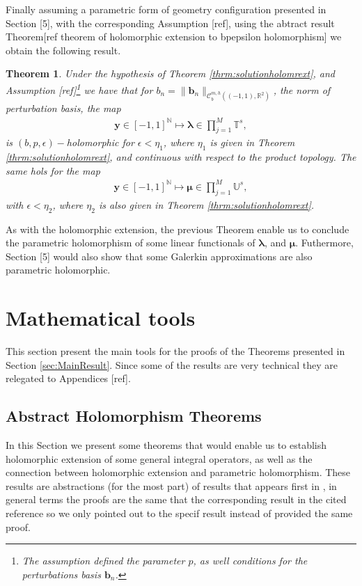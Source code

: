 \documentclass{article}
\newtheorem{theorem}{Theorem}[section]
\newcommand{\todo}[1]{{\color{red}[#1]}}
\newcommand{\bmu} {\bm{\mu}}
\newcommand{\IN}{{\mathbb N}}
\newcommand{\IR}{{\mathbb R}}
\newcommand{\IU}{{\mathbb U}}
\newcommand{\IT}{{\mathbb T}}
\newcommand{\rgeoh}[2]{\mathcal{C}_b^{#1,#2}\left( (-1,1), \IR^2 \right)}
\newcommand{\bla}{\boldsymbol \lambda}
\newcommand{\by}{\bm{y}}
\begin{document}
Finally assuming a parametric form of geometry configuration presented in Section \todo{5}, with the corresponding Assumption \todo{ref}, using the abtract result Theorem\todo{ref theorem of holomorphic extension to bpepsilon holomorphism} we obtain the following result. 

\begin{theorem}
Under the hypothesis of Theorem \ref{thrm:solutionholomrext}, and Assumption \todo{ref}\footnote{The assumption defined the parameter $p$, as well conditions for the perturbations basis $\mathbf{b}_n$.} we have that for $b_n = \|\mathbf{b}_n\|_{\rgeoh{m}{h}}$, the norm of perturbation basis, the map
\begin{align*}
\by \in [-1,1]^{\IN} \mapsto \bla \in \prod_{j=1}^M \IT^s,
\end{align*}
is $(b,p,\epsilon)-$holomorphic for $\epsilon < \eta_1$, where $\eta_1$ is given in Theorem \ref{thrm:solutionholomrext}, and continuous with respect to the product topology. The same hols for the map 
\begin{align*}
\by \in [-1,1]^{\IN} \mapsto \bmu \in \prod_{j=1}^M \IU^s,
\end{align*}
with $\epsilon < \eta_2$, where $\eta_2$ is also given in Theorem \ref{thrm:solutionholomrext}.
\end{theorem}
As with the holomorphic extension, the previous Theorem enable us to conclude the parametric holomorphism of some linear functionals of $\bla$, and $\bmu$. Futhermore, Section \todo{5} would also show that some Galerkin approximations are also parametric holomorphic. 
\section{Mathematical tools}
This section present the main tools for the proofs of the Theorems presented in Section \ref{sec:MainResult}. Since some of the results are very technical they are relegated to Appendices \todo{ref}.

\subsection{Abstract Holomorphism Theorems}

In this Section we present some theorems that would enable us to establish holomorphic extension of some general integral operators, as well as the connection between holomorphic extension and parametric holomorphism. These results are abstractions (for the most part) of results that appears first in \cite{Henriquez2021}, in general terms the proofs are the same that the corresponding result in the cited reference so we only pointed out to the specif result instead of provided the same proof. 
\end{document}
